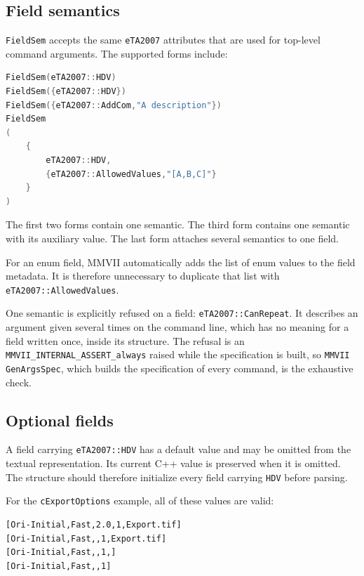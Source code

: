 
\subsection{Field semantics}

\texttt{FieldSem} accepts the same \texttt{eTA2007} attributes that are used for
top-level command arguments.  The supported forms include:

\begin{lstlisting}[language=C++]
FieldSem(eTA2007::HDV)
FieldSem({eTA2007::HDV})
FieldSem({eTA2007::AddCom,"A description"})
FieldSem
(
    {
        eTA2007::HDV,
        {eTA2007::AllowedValues,"[A,B,C]"}
    }
)
\end{lstlisting}

The first two forms contain one semantic.  The third form contains one semantic
with its auxiliary value.  The last form attaches several semantics to one field.

For an enum field, MMVII automatically adds the list of enum values to the field
metadata.  It is therefore unnecessary to duplicate that list with
\texttt{eTA2007::AllowedValues}.

One semantic is explicitly refused on a field: \texttt{eTA2007::CanRepeat}.  It
describes an argument given several times on the command line, which has no meaning
for a field written once, inside its structure.  The refusal is an
\texttt{MMVII\_INTERNAL\_ASSERT\_always} raised while the specification is built, so
\texttt{MMVII GenArgsSpec}, which builds the specification of every command, is the
exhaustive check.


\subsection{Optional fields}

A field carrying \texttt{eTA2007::HDV} has a default value and may be omitted from
the textual representation.  Its current C++ value is preserved when it is
omitted.  The structure should therefore initialize every field carrying
\texttt{HDV} before parsing.

For the \texttt{cExportOptions} example, all of these values are valid:

\begin{verbatim}
[Ori-Initial,Fast,2.0,1,Export.tif]
[Ori-Initial,Fast,,1,Export.tif]
[Ori-Initial,Fast,,1,]
[Ori-Initial,Fast,,1]
\end{verbatim}


